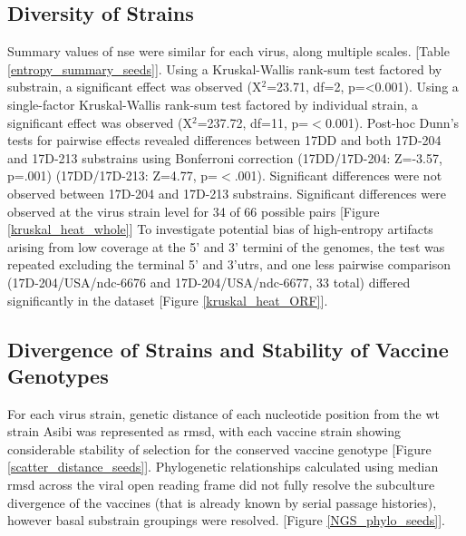 	\subsection{Diversity of Strains}
Summary values of \gls{nse} were similar for each virus, along multiple scales. [Table \ref{entropy_summary_seeds}]. Using a Kruskal-Wallis rank-sum test factored by substrain, a significant effect was observed (X$^2$=23.71, \gls{df}=2, p=<0.001). Using a single-factor Kruskal-Wallis rank-sum test factored by individual strain, a significant effect was observed (X$^2$=237.72, df=11, p=$<$0.001). Post-hoc Dunn’s tests for pairwise effects revealed differences between 17DD and both 17D-204 and 17D-213 substrains using Bonferroni correction (17DD/17D-204: Z=-3.57, p=.001) (17DD/17D-213: Z=4.77, p=$<$.001). Significant differences were not observed between 17D-204 and 17D-213 substrains. Significant differences were observed at the virus strain level for 34 of 66 possible pairs [Figure \ref{kruskal_heat_whole}] To investigate potential bias of high-entropy artifacts arising from low coverage at the 5’ and 3’ termini of the genomes, the test was repeated excluding the terminal 5’ and 3’\glspl{utr}, and one less pairwise comparison (17D-204/USA/\gls{ndc}-6676 and 17D-204/USA/\gls{ndc}-6677, 33 total) differed significantly in the dataset [Figure \ref{kruskal_heat_ORF}].
	\subsection{Divergence of Strains and Stability of Vaccine Genotypes}
For each virus strain, genetic distance of each nucleotide position from the \gls{wt} strain Asibi was represented as \gls{rmsd}, with each vaccine strain showing considerable stability of selection for the conserved vaccine genotype [Figure \ref{scatter_distance_seeds}]. Phylogenetic relationships calculated using median \gls{rmsd} across the viral open reading frame did not fully resolve the subculture divergence of the vaccines (that is already known by serial passage histories), however basal substrain groupings were resolved. [Figure \ref{NGS_phylo_seeds}].
